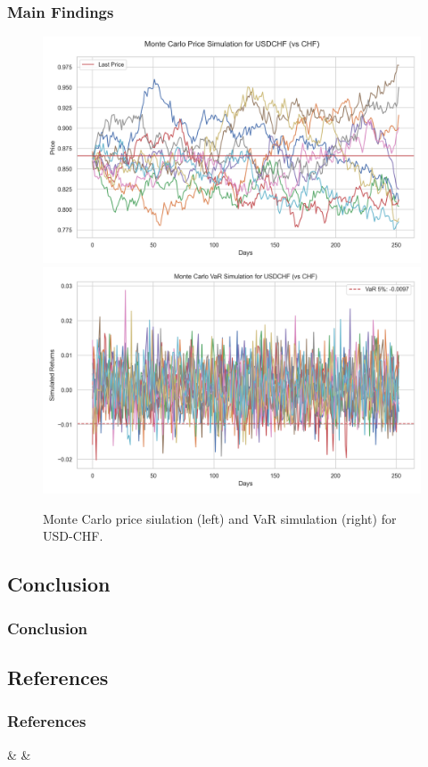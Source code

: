 \documentclass[10pt]{beamer}
\begin{document}
\begin{frame}
\frametitle{Main Findings}
\begin{figure}
    \centering  \includegraphics[width=0.48\linewidth]{reports/figures/monte_carlo_price_simulation_USDCHF_vs_CHF.png}  \label{fig:monte_carlo_price_simulation_USDCHF_vs_CHF}
    \includegraphics[width=0.49\linewidth]{reports/figures/monte_carlo_var_simulation_USDCHF_vs_CHF.png}  \label{fig:monte_carlo_var_simulation_USDCHF_vs_CHF}
    \caption{\footnotesize Monte Carlo price siulation (left) and VaR simulation (right) for USD-CHF.}
\end{figure}
\end{frame}
\begin{frame}
\section{Conclusion}
\frametitle{Conclusion}

\end{frame}
\begin{frame}
\section{References}
\frametitle{References}
\scriptsize \printbibliography
\end{frame}
\begin{frame}



{\csvcoli & \csvcolii & \csvcoliii}


    
\end{frame}
\end{document}
